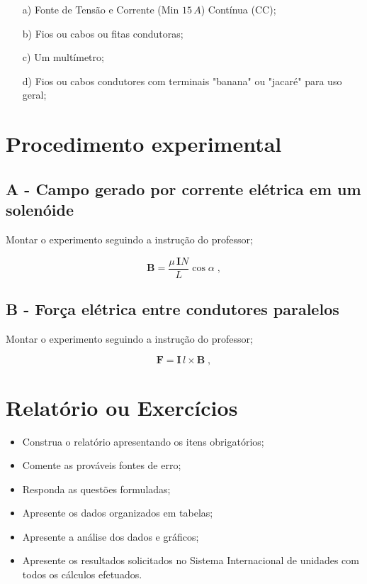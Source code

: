 	\begin{itemize}
		\item[a)] Fonte de Tensão e Corrente (Min $15\,A$) Contínua (CC);
		\item[b)] Fios ou cabos ou fitas condutoras;
		\item[c)] Um multímetro;
		\item[d)] Fios ou cabos condutores com terminais "banana" ou "jacaré" para uso geral;
		
	\end{itemize}

	\section{Procedimento experimental}
	
	\subsection*{A - Campo gerado por corrente elétrica em um solenóide}
	Montar o experimento seguindo a instrução do professor;
	
	\begin{equation}
    \mathbf{B}=\frac{\mu\,\mathbf{I}N}{L}\cos \alpha\;,
\end{equation}
	
	\subsection*{B - Força elétrica entre condutores paralelos}
	Montar o experimento seguindo a instrução do professor;
	
	\begin{equation}
    \mathbf{F}=\mathbf{I}\,l\times \mathbf{B}\;,
\end{equation}

\section{Relatório ou Exercícios}

\begin{itemize}
\item Construa o relatório apresentando os itens obrigatórios; 
\item Comente as prováveis fontes de erro;
\item Responda as questões formuladas;
\item Apresente os dados organizados em tabelas; 
\item Apresente a análise dos dados e gráficos; 
\item Apresente os resultados solicitados no Sistema Internacional de unidades com todos os cálculos efetuados.
\end{itemize}

